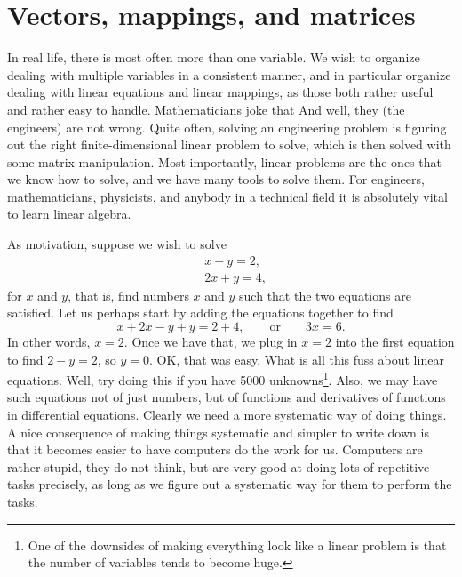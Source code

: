 \section{Vectors, mappings, and matrices}
\label{vecsandmaps:section}




In real life, there is most often more than one variable.
We wish to organize dealing with multiple variables in a consistent
manner, and in particular organize dealing with linear equations and linear
mappings, as those both rather useful and rather easy to handle.
Mathematicians joke that
And well, they (the engineers) are not wrong. 
Quite often, solving an engineering problem is figuring out the
right finite-dimensional linear problem to solve, which is then
solved with some matrix manipulation.
Most importantly, linear problems are the ones that we know how to solve,
and we have many tools to solve them.
For engineers, mathematicians, physicists, and anybody in a technical
field it is absolutely vital to learn linear algebra.

As motivation, suppose we wish to solve
\begin{equation*}
\begin{aligned}
& x-y = 2 , \\
& 2x+y = 4 ,
\end{aligned}
\end{equation*}
for $x$ and $y$, that is, find numbers $x$ and $y$ such that the two
equations are satisfied.
Let us perhaps start by adding the equations together to find
\begin{equation*}
x+2x-y+y = 2+4, \qquad \text{or} \qquad 3x = 6 .
\end{equation*}
In other words, $x=2$.  Once we have that, we plug in $x=2$ into the
first equation to find $2-y=2$, so $y=0$.  OK\@, that was easy.  What is all
this fuss about linear equations.  Well, try doing this if you have
5000 unknowns\footnote{One of the downsides of making everything look like a
linear problem is that the number of variables tends to become huge.}.
Also, we may have such equations not of just numbers,
but of functions and derivatives of functions in differential equations.
Clearly we need a more systematic way of doing things.
A nice consequence of making things systematic and simpler to write down
is that it becomes easier to have computers do the work for us.
Computers are rather stupid, they do not think,
but are very good at doing lots of repetitive
tasks precisely, as long as we figure out a systematic way for them to
perform the tasks.

